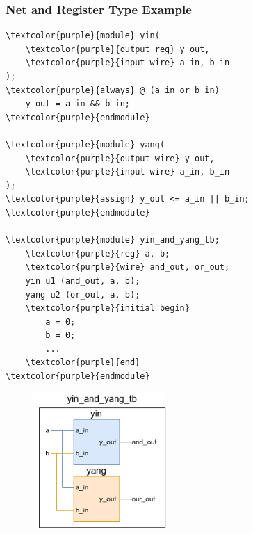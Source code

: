 \documentclass[t, notes, xcolor=table]{beamer}
\begin{document}
\begin{frame}[fragile]
\frametitle{Net and Register Type Example}

\begin{multicols}{2}
{\tiny%
\begin{Verbatim}[commandchars=\\\{\}, tabsize=2]
\textcolor{purple}{module} yin(
	\textcolor{purple}{output reg} y_out,
	\textcolor{purple}{input wire} a_in, b_in
);
\textcolor{purple}{always} @ (a_in or b_in)
	y_out = a_in && b_in;
\textcolor{purple}{endmodule}

\textcolor{purple}{module} yang(
	\textcolor{purple}{output wire} y_out,
	\textcolor{purple}{input wire} a_in, b_in
);
\textcolor{purple}{assign} y_out <= a_in || b_in;
\textcolor{purple}{endmodule}

\textcolor{purple}{module} yin_and_yang_tb;
	\textcolor{purple}{reg} a, b;
	\textcolor{purple}{wire} and_out, or_out;
	yin u1 (and_out, a, b);
	yang u2 (or_out, a, b);
	\textcolor{purple}{initial begin}
		a = 0;
		b = 0;
		...
	\textcolor{purple}{end}
\textcolor{purple}{endmodule}
\end{Verbatim}
}

\vfill

\columnbreak

\begin{figure}[H!]
    \includegraphics[width=0.45\textwidth]{img/04_net_example.png}
\end{figure}
\end{multicols}

\end{frame}
\end{document}
